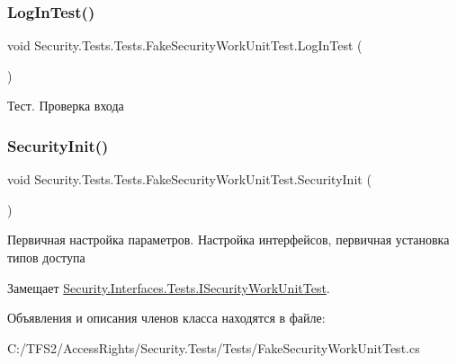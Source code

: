 \subsubsection{\texorpdfstring{Log\+In\+Test()}{LogInTest()}}
{\footnotesize\ttfamily void Security.\+Tests.\+Tests.\+Fake\+Security\+Work\+Unit\+Test.\+Log\+In\+Test (\begin{DoxyParamCaption}{ }\end{DoxyParamCaption})}



Тест. Проверка входа 

\mbox{\label{class_security_1_1_tests_1_1_tests_1_1_fake_security_work_unit_test_ab6d881ce39c896f7cc73eaa6946f3132}} 
\subsubsection{\texorpdfstring{Security\+Init()}{SecurityInit()}}
{\footnotesize\ttfamily void Security.\+Tests.\+Tests.\+Fake\+Security\+Work\+Unit\+Test.\+Security\+Init (\begin{DoxyParamCaption}{ }\end{DoxyParamCaption})}



Первичная настройка параметров. Настройка интерфейсов, первичная установка типов доступа 



Замещает \hyperlink{interface_security_1_1_interfaces_1_1_tests_1_1_i_security_work_unit_test_ad4c83a70952c1dfcdc15c1dc29b223a2}{Security.\+Interfaces.\+Tests.\+I\+Security\+Work\+Unit\+Test}.



Объявления и описания членов класса находятся в файле\+:\begin{DoxyCompactItemize}
\item 
C\+:/\+T\+F\+S2/\+Access\+Rights/\+Security.\+Tests/\+Tests/Fake\+Security\+Work\+Unit\+Test.\+cs\end{DoxyCompactItemize}

